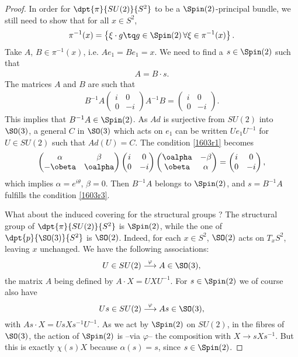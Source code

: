 \begin{proof}
In order for $\dpt{\pi}{SU(2)}{S^2}$ to be a $\Spin(2)$-principal bundle, we still need to show that for all $x\in S^2$,
\[
   \pi^{-1}(x)=\left\{\xi\cdot g\tq g\in\Spin(2)\,\forall\xi\in\pi^{-1}(x)\right\}.
\]
Take $A$, $B\in\pi^{-1}(x)$, i.e. $Ae_1=Be_1=x$. We need to find a $s\in\Spin(2)$ such that
\begin{eqnarray}
 \label{1603r3} A=B\cdot s.
\end{eqnarray}
The matrices $A$ and $B$ are such that
\begin{eqnarray}\label{1603r1}
 B^{-1} A\begin{pmatrix}
 i&0\\
 0&-i
         \end{pmatrix}A^{-1} B=\begin{pmatrix}
 i&0\\
 0&-i
         \end{pmatrix}.
\end{eqnarray}
This implies that $B^{-1} A\in\Spin(2)$. As $Ad$ is surjective from $SU(2)$ into $\SO(3)$, a general $C$ in $\SO(3)$ which acts on $e_1$ can be written $Ue_1U^{-1}$ for $U\in SU(2)$ such that $Ad(U)=C$. The condition \eqref{1603r1} becomes
\[
\begin{pmatrix}
\alpha&\beta\\
-\obeta&\oalpha
\end{pmatrix}
\begin{pmatrix}
i&0\\
0&-i
\end{pmatrix}
\begin{pmatrix}
\oalpha&-\beta\\
\obeta&\alpha
\end{pmatrix}=
\begin{pmatrix}
i&0\\
0&-i
\end{pmatrix},
\]
which implies $\alpha=e^{i\theta}$, $\beta=0$. Then $B^{-1} A$ belongs to $\Spin(2)$, and $s=B^{-1} A$ fulfills the condition \eqref{1603r3}.

What about the induced covering for the structural groups ? The structural group of $\dpt{\pi}{SU(2)}{S^2}$ is $\Spin(2)$, while the one of $\dpt{p}{\SO(3)}{S^2}$ is $\SO(2)$. Indeed, for each $x\in S^2$, $\SO(2)$ acts on $T_xS^2$, leaving $x$ unchanged. We have the following associations:
\[
         U\in SU(2)\stackrel{\varphi}{\longrightarrow}A\in \SO(3),
\]
the matrix $A$ being defined by $A\cdot X=UXU^{-1}$. For $s\in\Spin(2)$ we of course also have
\[
         Us\in SU(2)\stackrel{\varphi}{\longrightarrow}As\in \SO(3),
\]
with $As\cdot X=UsXs^{-1} U^{-1}$. As we act by $\Spin(2)$ on $SU(2)$, in the fibres of $\SO(3)$, the action of $\Spin(2)$ is --via $\varphi$-- the composition with $X\to sXs^{-1}$. But this is exactly $\chi(s)X$ because $\alpha(s)=s$, since $s\in\Spin(2)$.
\end{proof}

